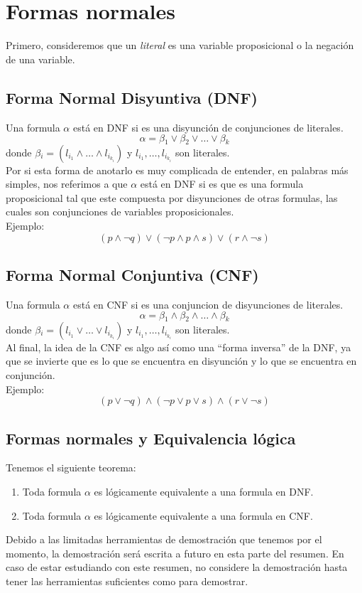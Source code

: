 \documentclass{article}
\begin{document}
\section{Formas normales}
Primero, consideremos que un \textit{literal} es una variable proposicional o la negación de una variable.\\
\subsection{Forma Normal Disyuntiva (DNF)}
Una formula $\alpha$ está en DNF si es una disyunción de conjunciones de literales.
$$\alpha{} = \beta{}_{1} \vee{} \beta{}_{2} \vee{} \ldots{} \vee{} \beta{}_{k}$$
donde $\beta{}_{i} = (l_{i_{1}} \wedge{} \ldots{} \wedge{} l_{i_{k_{i}}})$ y $l_{i_{1}}, \ldots{}, l_{i_{k_{i}}}$ son literales.\\
Por si esta forma de anotarlo es muy complicada de entender, en palabras más simples, nos referimos a que $\alpha$ está en DNF si es que es una formula proposicional tal que este compuesta por disyunciones de otras formulas, las cuales son conjunciones de variables proposicionales.\\
Ejemplo:
    $$(p \wedge{} \neg{} q) \vee{} (\neg{} p \wedge{} p \wedge{} s) \vee{} (r \wedge{} \neg{} s)$$

\subsection{Forma Normal Conjuntiva (CNF)}
Una formula $\alpha$ está en CNF si es una conjuncion de disyunciones de literales.
$$\alpha{} = \beta{}_{1} \wedge{} \beta{}_{2} \wedge{} \ldots{} \wedge{} \beta{}_{k}$$
donde $\beta{}_{i} = (l_{i_{1}} \vee{} \ldots{} \vee{} l_{i_{k_{i}}})$ y $l_{i_{1}}, \ldots{}, l_{i_{k_{i}}}$ son literales.\\
Al final, la idea de la CNF es algo así como una ``forma inversa'' de la DNF, ya que se invierte que es lo que se encuentra en disyunción y lo que se encuentra en conjunción.\\
Ejemplo:
    $$(p \vee{} \neg{} q) \wedge{} (\neg{} p \vee{} p \vee{} s) \wedge{} (r \vee{} \neg{} s)$$

\subsection{Formas normales y Equivalencia lógica}
Tenemos el siguiente teorema:
\begin{enumerate}
    \item Toda formula $\alpha$ es lógicamente equivalente a una formula en DNF.
    \item Toda formula $\alpha$ es lógicamente equivalente a una formula en CNF.
\end{enumerate}
Debido a las limitadas herramientas de demostración que tenemos por el momento, la demostración será escrita a futuro en esta parte del resumen. En caso de estar estudiando con este resumen, no considere la demostración hasta tener las herramientas suficientes como para demostrar.
\end{document}
